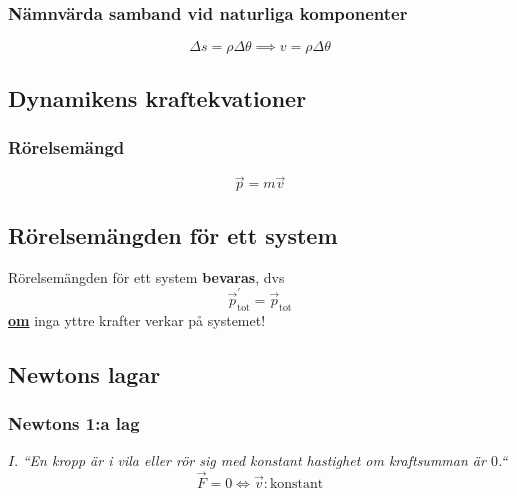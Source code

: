 \documentclass{article}
\newenvironment{ankiflashcard}[1]{}{}
\begin{document}
\begin{paracol}{2}
\subsubsection{Nämnvärda samband vid naturliga komponenter}

\begin{ankiflashcard}{Hur definieras hastighet i naturliga kompontenter? (trevligt trick)}
    $$
    \Delta s = \rho \Delta \theta
    \implies v = \rho \Delta \theta   $$
\end{ankiflashcard}
\subsection{Dynamikens kraftekvationer}

\begin{ankiflashcard}{Definiera rörelsemängd}
    
\subsubsection{Rörelsemängd}
$$\vec p = m \vec v$$
\end{ankiflashcard}

\begin{ankiflashcard}{Vad är sant om rörelsemängdslagen för ett system?}
\subsection{Rörelsemängden för ett system}
Rörelsemängden för ett system \textbf{bevaras}, dvs
$$\vec p_{\text{tot}}^{\prime} = \vec p_{\text{tot}}$$ \underline{\textbf{om}} inga yttre krafter verkar på systemet!
\end{ankiflashcard}

\subsection{Newtons lagar}
\begin{ankiflashcard}{Vad säger Newtons första lag?}
    
\subsubsection{Newtons 1:a lag}
$I.$ \textit{``En kropp är i vila eller rör sig med konstant hastighet om kraftsumman är $0$.``}
$$\vec F = 0 \iff \vec v: \text{konstant}$$
\end{ankiflashcard}


\end{paracol}
\end{document}
